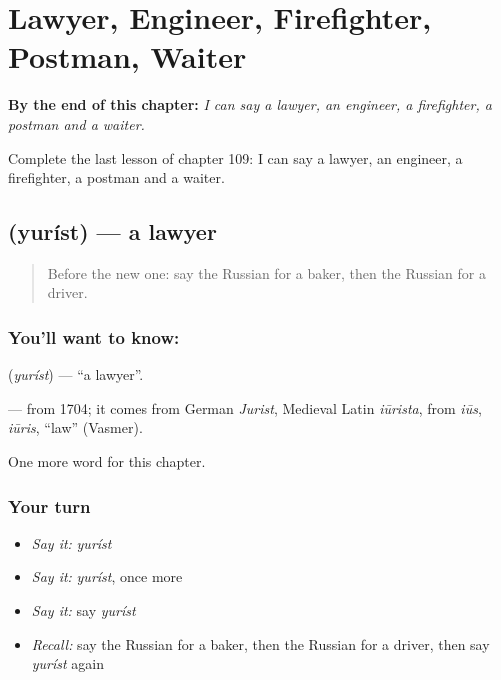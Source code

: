 
\chapter{Lawyer, Engineer, Firefighter, Postman, Waiter}
\label{ch:ru-lawyer-engineer-firefighter-postman-waiter}

\begin{chapteropening}
\textbf{By the end of this chapter:} \emph{I can say a lawyer, an engineer, a firefighter, a postman and a waiter.}

Complete the last lesson of chapter 109: I can say a lawyer, an engineer, a firefighter, a postman and a waiter.
\end{chapteropening}

\section[\texorpdfstring{\ru{юрист} (yuríst)}{юрист (yuríst)}]{ (yuríst) — a lawyer}

\label{lesson:RU-C109-lawyer}



\begin{quote}
Before the new one: say the Russian for a baker, then the Russian for a driver.
\end{quote}

\subsection*{You'll want to know: }
\textbf{} (\emph{yuríst}) — \textquotedblleft{}a lawyer\textquotedblright{}.

\begin{cousinweb}
\textbf{} — from 1704; it comes from German \emph{Jurist}, Medieval Latin \emph{iūrista}, from \emph{iūs}, \emph{iūris}, \textquotedblleft{}law\textquotedblright{} (Vasmer).
\end{cousinweb}

\begin{grammarlens}[title={What you've built}]
One more word for this chapter.
\end{grammarlens}

\subsection*{Your turn}
\begin{itemize}
\raggedright
  \item \emph{Say it:} \emph{yuríst}
  \item \emph{Say it:} \emph{yuríst}, once more
  \item \emph{Say it:} say \emph{yuríst}
  \item \emph{Recall:} say the Russian for a baker, then the Russian for a driver, then say \emph{yuríst} again
\end{itemize}

